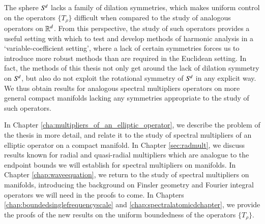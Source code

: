 The sphere ${S}^{\!{d}}$ lacks a family of dilation symmetries, which makes uniform control on the operators $\{ T_{\!\rho} \}$ difficult when compared to the study of analogous operators on $\operatorname{\mathbb{R}}^d$. From this perspective, the study of such operators provides a useful setting with which to test and develop methods of harmonic analysis in a `variable-coefficient setting', where a lack of certain symmetries forces us to introduce more robust methods than are required in the Euclidean setting.
%
%
%
In fact, the methods of this thesis not only get around the lack of dilation symmetry on ${S}^{\!{d}}$, but also do not exploit the rotational symmetry of ${S}^{\!{d}}$ in any explicit way. We thus obtain results for analogous spectral multipliers operators on more general compact manifolds lacking any symmetries appropriate to the study of such operators.
%

In Chapter \ref{cha:multipliers_of_an_elliptic_operator}, we describe the problem of the thesis in more detail, and relate it to the study of spectral multipliers of an elliptic operator on a compact manifold. In Chapter \ref{sec:radmult}, we discuss results known for radial and quasi-radial multipliers which are analogue to the endpoint bounds we will establish for spectral multipliers on manifolds. In Chapter \ref{chap:waveequation}, we return to the study of spectral multipliers on manifolds, introducing the background on Finsler geometry and Fourier integral operators we will need in the proofs to come. In Chapters \ref{chap:boundedsinglefrequencyscale} and \ref{chap:spectralatomicdchapter}, we provide the proofs of the new results on the uniform boundedness of the operators $\{ T_\rho \}$.%

\pagebreak[3]